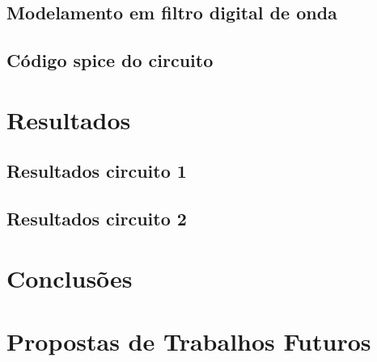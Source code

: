 	\section{Modelamento em filtro digital de onda}
	
	\section{Código spice do circuito}

	\chapter{Resultados}
	
	\section{Resultados circuito 1}
	
	\section{Resultados circuito 2}
	

	\chapter{Conclusões}

	\chapter{Propostas de Trabalhos Futuros}

	\postextual
	

	\begin{apendicesenv}
	\partapendices
\end{apendicesenv}

	\begin{anexosenv}
	\partanexos
\end{anexosenv}


